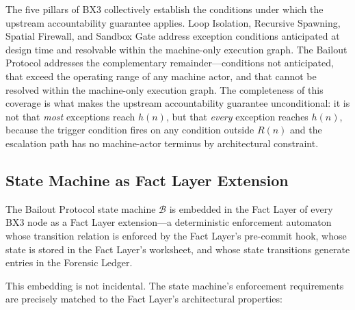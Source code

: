 The five pillars of BX3 collectively establish the conditions under which the upstream accountability guarantee applies. Loop Isolation, Recursive Spawning, Spatial Firewall, and Sandbox Gate address exception conditions anticipated at design time and resolvable within the machine-only execution graph. The Bailout Protocol addresses the complementary remainder---conditions not anticipated, that exceed the operating range of any machine actor, and that cannot be resolved within the machine-only execution graph. The completeness of this coverage is what makes the upstream accountability guarantee unconditional: it is not that \emph{most} exceptions reach $h(n)$, but that \emph{every} exception reaches $h(n)$, because the trigger condition fires on any condition outside $R(n)$ and the escalation path has no machine-actor terminus by architectural constraint.

\subsection{State Machine as Fact Layer Extension}
\label{sec:state-machine-extension}

The Bailout Protocol state machine $\mathcal{B}$ is embedded in the Fact Layer of every BX3 node as a Fact Layer extension---a deterministic enforcement automaton whose transition relation is enforced by the Fact Layer's pre-commit hook, whose state is stored in the Fact Layer's worksheet, and whose state transitions generate entries in the Forensic Ledger.

This embedding is not incidental. The state machine's enforcement requirements are precisely matched to the Fact Layer's architectural properties:

